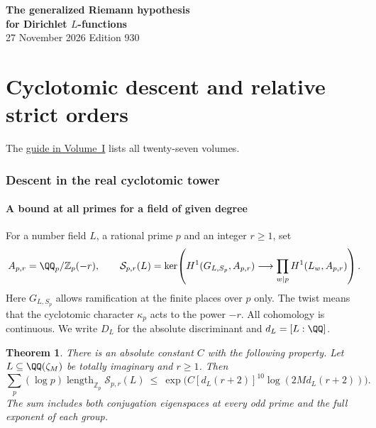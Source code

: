 \documentclass[a4paper,11pt]{article}
\newtheorem{theorem}[proposition]{Theorem}
\theoremstyle{definition}
\theoremstyle{remark}
\newcommand{\ZZ}{\mathbb Z}\newcommand{\ord}{\operatorname{ord}}
\newcommand{\len}{\operatorname{length}}\newcommand{\Res}{\operatorname*{Res}}
\numberwithin{equation}{section}
\newcommand{\Sel}{\mathcal S}
\begin{document}
\setcounter{part}{3}
\thispagestyle{plain}\begin{center}
{\LARGE\bfseries The generalized Riemann hypothesis\\[2pt]for Dirichlet \(L\)-functions}\\[6pt]
{\small 27 November 2026 \quad\textperiodcentered\quad Edition 930}\end{center}
\part{Cyclotomic descent and relative strict orders}\label{part:IV}
\begin{abstract}\noindent We descend in the real cyclotomic tower, determine the ranges of coefficient primes and track exceptional twists. Norm maps compare the strict orders at consecutive layers.\end{abstract}
\setcounter{section}{18}
\noindent The \hyperref[seriesguide]{guide in Volume~I} lists all twenty-seven volumes.
\begingroup\small\setlength{\parskip}{0pt}\tableofcontents\endgroup
\clearpage

\section{Descent in the real cyclotomic tower}\label{nav:g-II-1}\label{nav:volume-IV}

\subsection{A bound at all primes for a field of given degree}\label{nav:II-13}
For a number field \(L\), a rational prime \(p\) and an integer \(r\ge1\), set
\[
 A_{p,r}=\QQ_p/\ZZ_p(-r),\qquad
 \Sel_{p,r}(L)=\ker\!\left(H^1(G_{L,S_p},A_{p,r})
                  \longrightarrow\prod_{w\mid p}H^1(L_w,A_{p,r})\right).
\]
Here \(G_{L,S_p}\) allows ramification at the finite places over \(p\) only. The twist means that the cyclotomic character \(\kappa_p\) acts to the power \(-r\). All cohomology is continuous. We write \(D_L\) for the absolute discriminant and \(d_L=[L:\QQ]\).

\begin{theorem}\label{thm:bound}
There is an absolute constant \(C\) with the following property. Let \(L\subseteq\QQ(\zeta_M)\) be totally imaginary and \(r\ge1\). Then
\begin{equation}
 \sum_p(\log p)\len_{\ZZ_p}\Sel_{p,r}(L)
 \ \le\ \exp\!\big(C[d_L(r+2)]^{10}\log(2M d_L(r+2))\big).
 \label{eq:all}
\end{equation}
The sum includes both conjugation eigenspaces at every odd prime and the full exponent of each group.
\end{theorem}
\end{document}
